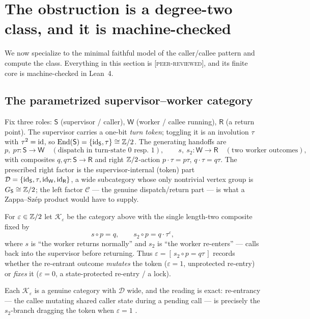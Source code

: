 \section{The obstruction is a degree-two class, and it is machine-checked}
\label{sec:blk-machine}

We now specialize to the minimal faithful model of the caller/callee pattern and compute
the class. Everything in this section is \textsc{[peer-reviewed]}, and its finite core is
machine-checked in Lean~4.

\subsection*{The parametrized supervisor--worker category}

Fix three roles: $\mathsf S$ (supervisor / caller), $\mathsf W$ (worker / callee
running), $\mathsf R$ (a return point). The supervisor carries a one-bit \emph{turn
token}; toggling it is an involution $\tau$ with $\tau^2=\mathrm{id}$, so
$\operatorname{End}(\mathsf S)=\{\mathrm{id}_{\mathsf S},\tau\}\cong\mathbb{Z}/2$. The generating handoffs are
\[
  p,\ p\tau\colon\mathsf S\to\mathsf W \quad(\text{dispatch in turn-state $0$ resp.\ $1$}),
  \qquad
  s,\ s_2\colon\mathsf W\to\mathsf R \quad(\text{two worker outcomes}),
\]
with composites $q,q\tau\colon\mathsf S\to\mathsf R$ and right $\mathbb{Z}/2$-action
$p\cdot\tau=p\tau$, $q\cdot\tau=q\tau$. The prescribed right factor is the
supervisor-internal (token) part
$\mathcal D=\{\mathrm{id}_{\mathsf S},\tau,\mathrm{id}_{\mathsf W},\mathrm{id}_{\mathsf R}\}$, a wide subcategory
whose only nontrivial vertex group is $G_{\mathsf S}\cong\mathbb{Z}/2$; the left factor
$\mathcal C$ --- the genuine dispatch/return part --- is what a Zappa--Sz\'ep product
would have to supply.

\begin{definition}
\label{def:blk-family}
For $\varepsilon\in\mathbb{Z}/2$ let $\mathcal K_\varepsilon$ be the category above with the single
length-two composite fixed by
\[
  s\circ p = q,
  \qquad
  s_2\circ p = q\cdot\tau^{\varepsilon},
\]
where $s$ is ``the worker returns normally'' and $s_2$ is ``the worker re-enters'' ---
calls back into the supervisor before returning. Thus
$\varepsilon=[\,s_2\circ p = q\tau\,]$ records whether the re-entrant outcome
\emph{mutates} the token ($\varepsilon=1$, unprotected re-entry) or \emph{fixes} it
($\varepsilon=0$, a state-protected re-entry / a lock).
\end{definition}

Each $\mathcal K_\varepsilon$ is a genuine category with $\mathcal D$ wide, and the reading
is exact: re-entrancy --- the callee mutating shared caller state during a pending call ---
is precisely the $s_2$-branch dragging the token when $\varepsilon=1$ \cite{macbeth-reduction}.

